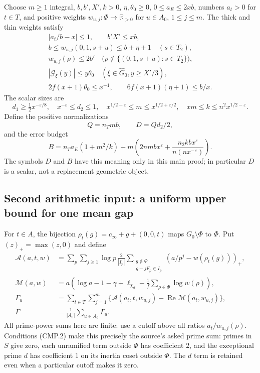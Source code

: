 Choose $m\ge1$ integral, $b,b',X',k>0$, $\eta,\theta_0\ge0$,
$0\le a_E\le2xb$, numbers $a_t>0$ for $t\in T$, and positive
weights $w_{u,j}:\Phi\to\mathbb R_{>0}$ for
$u\in A_0$, $1\le j\le m$.  The thick and thin weights satisfy
\begin{gather*}
 |a_t/b-x|\le1,\qquad b'X'\le xb,\\
 b\le w_{u,j}(0,1,s+u)\le b+\eta+1\quad(s\in T_2),\\
 w_{u,j}(\rho)\le2b'
   \quad\bigl(\rho\notin\{(0,1,s+u):s\in T_2\}\bigr),\\
 |\mathcal G_\xi(y)|\le y\theta_0
           \quad(\xi\in\widehat G_0, y\ge X'/3),\\
 2f(x+1)\theta_0\le x^{-1},\qquad
 6f(x+1)(\eta+1)\le b/x.                         \tag{CMP.5}
\end{gather*}
The scalar sizes are
\[
 d_1\ge\tfrac12x^{-\varepsilon/8},\quad
 x^{-\varepsilon}\le d_2\le1,\quad
 x^{1/2-\varepsilon}\le m\le x^{1/2+\varepsilon/2},\quad
 xm\le k\le n^2x^{1/2-\varepsilon}.                \tag{CMP.6}
\]
Define the positive normalizations
\[
 Q=n_Tmb,\qquad D=Qd_2/2,
\]
and the error budget
\[
 B=n_Ta_E(1+m^2/k)
       +m\left(2nmbx^\varepsilon+
            \frac{n_2kbx^\varepsilon}{n(nx^{-\varepsilon})}\right).
 \tag{CMP.7}
\]
The symbols $D$ and $B$ have this meaning only in this main proof;
in particular $D$ is a scalar, not a replacement geometric object.

\subsection{Second arithmetic input: a uniform upper bound for one mean gap}

For $t\in A$, the bijection
$\rho_t(g)=c_\infty+g+(0,0,t)$ maps $G_0\setminus\Phi$ to
$\Phi$.  Put $(z)_+=\max(z,0)$ and define
\begin{align*}
 \mathcal A(a,t,w)
 &=\sum_{p}\sum_{j\ge1}\log p\,
       \frac2{|I_p|}
       \sum_{\substack{g\notin\Phi\\g-jF_p\in I_p}}
                    (a/p^j-w(\rho_t(g)))_+,\\
 \mathcal M(a,w)
 &=a\left(\log a-1-\gamma+\ell_{\chi_d}
                         -\frac1f\sum_{\rho\in\Phi}\log w(\rho)\right),\\
 \Gamma_u
 &=\sum_{t\in T}\sum_{j=1}^m
       \{\mathcal A(a_t,t,w_{u,j})
                         -\operatorname{Re}\mathcal M(a_t,w_{u,j})\},\\
 \overline\Gamma&=\frac1{|A_0|}\sum_{u\in A_0}\Gamma_u.
                                                               \tag{CMP.8}
\end{align*}
All prime-power sums here are finite: use a cutoff above all ratios
$a_t/w_{u,j}(\rho)$.  Conditions (CMP.2) make this precisely the
source's asked prime sum: primes in $S$ give zero, each unramified
term outside $\Phi$ has coefficient $2$, and the exceptional prime
$d$ has coefficient $1$ on its inertia coset outside $\Phi$.
The $d$ term is retained even when a particular cutoff makes it zero.

